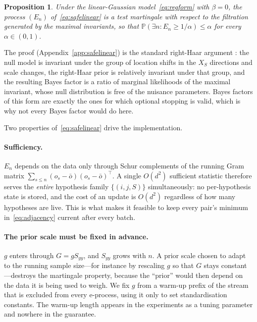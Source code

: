 \documentclass[pdflatex,sn-apa]{sn-jnl}
\theoremstyle{thmstyleone}%
\newtheorem{proposition}[theorem]{Proposition}%
\theoremstyle{thmstyletwo}%
\theoremstyle{thmstylethree}%
\newcommand{\Prob}{\mathbb{P}}
\begin{document}
\begin{proposition}\label{prop:safelinear}
Under the linear-Gaussian model~\eqref{eq:regform} with $\beta = 0$, the
process $(E_n)$ of~\eqref{eq:safelinear} is a test martingale with respect to
the filtration generated by the maximal invariants, so that
$\Prob(\exists n: E_n \ge 1/\alpha) \le \alpha$ for every $\alpha \in (0,1)$.
\end{proposition}

The proof (Appendix~\ref{app:safelinear}) is the standard right-Haar argument
\citep{berger1998bayes,hendriksen2021optional}: the null model is invariant
under the group of location shifts in the $X_S$ directions and scale changes,
the right-Haar prior is relatively invariant under that group, and the
resulting Bayes factor is a ratio of marginal likelihoods of the maximal
invariant, whose null distribution is free of the nuisance parameters. Bayes
factors of this form are exactly the ones for which optional stopping is
valid, which is why not every Bayes factor would do here.

Two properties of~\eqref{eq:safelinear} drive the implementation.

\paragraph{Sufficiency.} $E_n$ depends on the data only through Schur
complements of the running Gram matrix
$\sum_{s \le n} (o_s - \bar o)(o_s - \bar o)^\top$. A single $O(d^2)$
sufficient statistic therefore serves the \emph{entire} hypothesis family
$\{(i,j,S)\}$ simultaneously: no per-hypothesis state is stored, and the cost
of an update is $O(d^2)$ regardless of how many hypotheses are live. This is
what makes it feasible to keep every pair's minimum
in~\eqref{eq:adjacency} current after every batch.

\paragraph{The prior scale must be fixed in advance.} $g$ enters
through $G = g S_{yy}$, and $S_{yy}$ grows with $n$. A prior scale chosen to
adapt to the running sample size---for instance by rescaling $g$ so that $G$
stays constant---destroys the martingale property, because the ``prior'' would
then depend on the data it is being used to weigh. We fix $g$ from a warm-up
prefix of the stream that is excluded from every e-process, using it only to
set standardisation constants. The warm-up length appears in the experiments
as a tuning parameter and nowhere in the guarantee.
\end{document}
